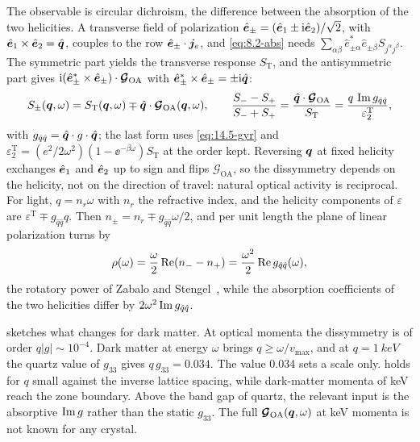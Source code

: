 The observable is circular dichroism, the difference between the absorption of the two helicities. A transverse field of polarization $\hat{\bm{e}}_\pm = (\hat{\bm{e}}_1 \pm \mathrm{i}\hat{\bm{e}}_2)/\sqrt2$, with $\hat{\bm{e}}_1\times\hat{\bm{e}}_2 = \hat{\bm{q}}$, couples to the row $\hat{\bm{e}}_\pm\cdot\bm{j}_e$, and \cref{eq:8.2-abs} needs $\sum_{\alpha\beta}\hat e^*_{\pm\alpha}\hat e_{\pm\beta}S_{j^\alpha j^\beta}$. The symmetric part yields the transverse response $S_{\mathrm{T}}$, and the antisymmetric part gives $\mathrm{i}(\hat{\bm{e}}^*_\pm\times\hat{\bm{e}}_\pm)\cdot\boldsymbol{\mathcal{G}}_{\mathrm{OA}}$ with $\hat{\bm{e}}^*_\pm\times\hat{\bm{e}}_\pm = \pm\mathrm{i}\hat{\bm{q}}$:
\begin{equation}
  S_\pm(\bm{q},\omega) = S_{\mathrm{T}}(\bm{q},\omega) \mp \hat{\bm{q}}\cdot\boldsymbol{\mathcal{G}}_{\mathrm{OA}}(\bm{q},\omega), \qquad
  \frac{S_- - S_+}{S_- + S_+} = \frac{\hat{\bm{q}}\cdot\boldsymbol{\mathcal{G}}_{\mathrm{OA}}}{S_{\mathrm{T}}} = \frac{q\,\operatorname{Im} g_{\hat q\hat q}}{\varepsilon_2^{\mathrm{T}}} ,
  \label{eq:14.5-helicity}
\end{equation}
with $g_{\hat q\hat q} = \hat{\bm{q}}\cdot g\cdot\hat{\bm{q}}$; the last form uses \cref{eq:14.5-gyr} and $\varepsilon_2^{\mathrm{T}} = (e^2/2\omega^2)(1 - \ee^{-\beta\omega})S_{\mathrm{T}}$ at the order kept. Reversing $\bm{q}$ at fixed helicity exchanges $\hat{\bm{e}}_1$ and $\hat{\bm{e}}_2$ up to sign and flips $\boldsymbol{\mathcal{G}}_{\mathrm{OA}}$, so the dissymmetry depends on the helicity, not on the direction of travel: natural optical activity is reciprocal. For light, $q = n_r\omega$ with $n_r$ the refractive index, and the helicity components of $\varepsilon$ are $\varepsilon^{\mathrm{T}} \mp g_{\hat q\hat q}q$. Then $n_\pm = n_r \mp g_{\hat q\hat q}\omega/2$, and per unit length the plane of linear polarization turns by
\begin{equation}
  \rho(\omega) = \frac{\omega}{2}\operatorname{Re}(n_- - n_+) = \frac{\omega^2}{2}\operatorname{Re} g_{\hat q\hat q}(\omega) ,
  \label{eq:14.5-rot}
\end{equation}
the rotatory power of Zabalo and Stengel~\cite[Eq.~(4)]{zabalo2023natural}, while the absorption coefficients of the two helicities differ by $2\omega^2\operatorname{Im} g_{\hat q\hat q}$.

 sketches what changes for dark matter. At optical momenta the dissymmetry is of order $q|g| \sim 10^{-4}$. Dark matter at energy $\omega$ brings $q \ge \omega/v_{\mathrm{max}}$, and at $q = \SI{1}{keV}$ the quartz value of $g_{33}$ gives $q\,g_{33} = 0.034$. The value 0.034 sets a scale only.  holds for $q$ small against the inverse lattice spacing, while dark-matter momenta of keV reach the zone boundary. Above the band gap of quartz, the relevant input is the absorptive $\operatorname{Im} g$ rather than the static $g_{33}$. The full $\boldsymbol{\mathcal{G}}_{\mathrm{OA}}(\bm{q},\omega)$ at keV momenta is not known for any crystal.

